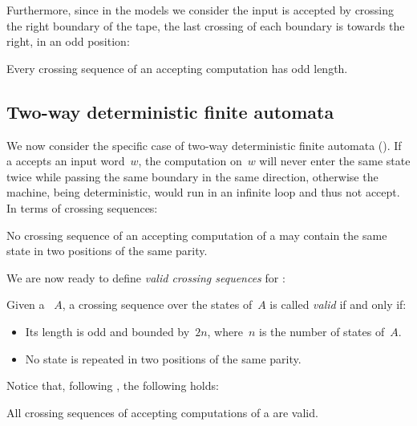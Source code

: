 Furthermore, since in the models we consider the input is accepted by crossing the right boundary of the tape, the last crossing of each boundary is towards the right, \ie in an odd position:
\begin{fact}\label{fact:crossing-length}
	Every crossing sequence of an accepting computation has odd length.
\end{fact}


\subsection{Two-way deterministic finite automata}
We now consider the specific case of two-way deterministic finite automata (\TDFAs).
If a \TDFA accepts an input word~$w$, the computation on~$w$ will never enter the same state twice while passing the same boundary in the same direction, otherwise the machine, being deterministic, would run in an infinite loop and thus not accept.
In terms of crossing sequences:
\begin{fact}\label{fact:crossing-2DFA-parity}
	No crossing sequence of an accepting computation of a \TDFA may contain the same state in two positions of the same parity.
\end{fact}

We are now ready to define \emph{valid crossing sequences} for \TDFAs:
\begin{defn}\label{def:validcrossing2DFA}
	Given a \TDFA~$A$, a crossing sequence over the states of~$A$ is called \emph{valid} if and only if:
	\begin{itemize}
		\item Its length is odd and bounded by~$2n$, where~$n$ is the number of states of~$A$.
		\item No state is repeated in two positions of the same parity.
	\end{itemize}
\end{defn}

Notice that, following , the following holds:
\begin{fact}
	All crossing sequences of accepting computations of a \TDFA are valid.
\end{fact}

